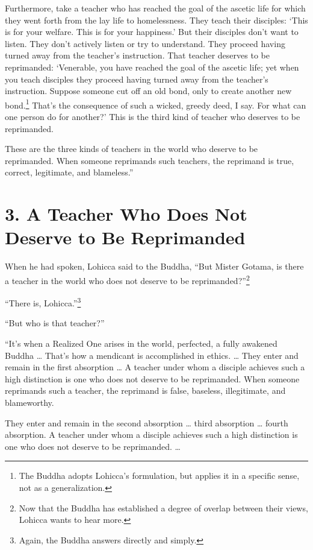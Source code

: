 \documentclass[12pt,openany]{book}%
\begin{document}
Furthermore, take a teacher who has reached the goal of the ascetic life for which they went forth from the lay life to homelessness. They teach their disciples: ‘This is for your welfare. This is for your happiness.’ But their disciples don’t want to listen. They don’t actively listen or try to understand. They proceed having turned away from the teacher’s instruction. That teacher deserves to be reprimanded: ‘Venerable, you have reached the goal of the ascetic life; yet when you teach disciples they proceed having turned away from the teacher’s instruction. Suppose someone cut off an old bond, only to create another new bond.\footnote{The Buddha adopts Lohicca’s formulation, but applies it in a specific sense, not as a generalization. } That’s the consequence of such a wicked, greedy deed, I say. For what can one person do for another?’ This is the third kind of teacher who deserves to be reprimanded. 

These are the three kinds of teachers in the world who deserve to be reprimanded. When someone reprimands such teachers, the reprimand is true, correct, legitimate, and blameless.” 

\section*{3. A Teacher Who Does Not Deserve to Be Reprimanded }

When he had spoken, Lohicca said to the Buddha, “But Mister Gotama, is there a teacher in the world who does not deserve to be reprimanded?”\footnote{Now that the Buddha has established a degree of overlap between their views, Lohicca wants to hear more. } 

“There is, Lohicca.”\footnote{Again, the Buddha answers directly and simply. } 

“But who is that teacher?” 

“It’s when a Realized One arises in the world, perfected, a fully awakened Buddha … That’s how a mendicant is accomplished in ethics. … They enter and remain in the first absorption … A teacher under whom a disciple achieves such a high distinction is one who does not deserve to be reprimanded. When someone reprimands such a teacher, the reprimand is false, baseless, illegitimate, and blameworthy. 

They enter and remain in the second absorption … third absorption … fourth absorption. A teacher under whom a disciple achieves such a high distinction is one who does not deserve to be reprimanded. … 
\end{document}
